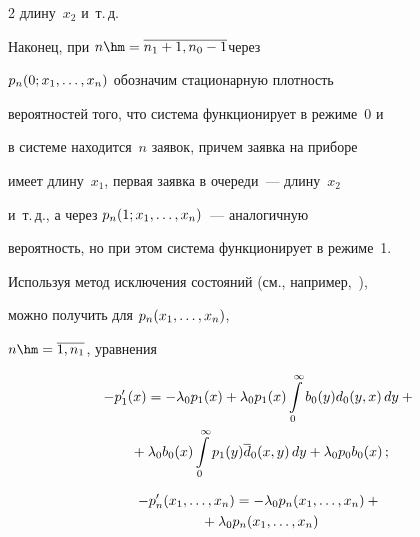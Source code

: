\begin{multicols}{2}
длину~$x_2$ и~т.\,д.


Наконец, при $n\hm=\overline{n_1+1,n_0-1}$\linebreak через


$p_n(0;x_1,\ldots,x_n)$ обозначим стационарную плотность


вероятностей того, что система функционирует в режиме~0 и


в системе находится~$n$ заявок, причем заявка на приборе


имеет длину~$x_1$, первая заявка в очереди~--- длину~$x_2$


и~т.\,д., а через $p_n(1;x_1,\ldots,x_n)$~--- аналогичную


вероятность, но при этом система функционирует в режиме~1.





Используя метод исключения состояний (см., например,~\cite{22-m}), 


можно получить для $p_n(x_1,\ldots,x_n)$,


$n\hm=\overline{1,n_1}$, уравнения




\begin{multline}


\label{3-0-m}


-p'_1(x)=-\lambda_0 p_1(x)+\lambda_0 p_1(x)\int\limits_0^\infty b_0(y) d_0(y,x)\, dy


+{}


\\


{}+\lambda_0 b_0(x)\int\limits_0^\infty p_1(y) \d_0(x,y)\, dy+


\lambda_0 p_0 b_0(x)\,;


\end{multline}







\vspace*{-12pt}





\noindent


\begin{multline*}




-p'_n(x_1,\ld,x_n) = - \lambda_0 p_{n}(x_1,\ld,x_n) +{}\\


{}+ \lambda_0 p_n(x_1,\ld,x_n)



\end{multline*}
\end{multicols}
